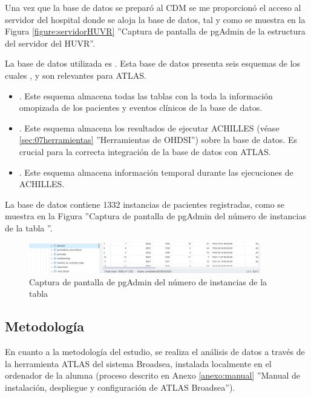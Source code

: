 Una vez que la base de datos se preparó al CDM se me proporcionó el acceso al servidor del hospital donde se aloja la base de datos, tal y como se muestra en la Figura \ref{figure:servidorHUVR} ''Captura de pantalla de pgAdmin de la estructura del servidor del HUVR''.

La base de datos utilizada es . Esta base de datos presenta seis esquemas de los cuales ,  y  son relevantes para ATLAS.

\begin{itemize}
    \item \textbf{}. Este esquema almacena todas las tablas con la toda la información omopizada de los pacientes y eventos clínicos de la base de datos.
    \item \textbf{}. Este esquema almacena los resultados de ejecutar ACHILLES (véase \ref{sec:07herramientas} ''Herramientas de OHDSI'') sobre la base de datos. Es crucial para la correcta integración de la base de datos con ATLAS.
    \item \textbf{}. Este esquema almacena información temporal durante las ejecuciones de ACHILLES.
\end{itemize}

La base de datos contiene 1332 instancias de pacientes registradas, como se muestra en la Figura ''Captura de pantalla de pgAdmin del número de instancias de la tabla ''.

\begin{figure}[H]
    \centering
    \includegraphics[width=0.90\textwidth]{figures/personCount.png}
    \caption{Captura de pantalla de pgAdmin del número de instancias de la tabla }
    \label{figure:personCount}
\end{figure}

\subsection{Metodología}

En cuanto a la metodología del estudio, se realiza el análisis de datos a través de la herramienta ATLAS del sistema Broadsea, instalada localmente en el ordenador de la alumna (proceso descrito en Anexo \ref{anexo:manual} ''Manual de instalación, despliegue y configuración de ATLAS Broadsea''). 

